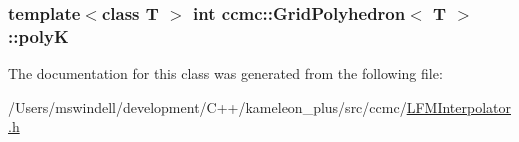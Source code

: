 \hypertarget{classccmc_1_1_grid_polyhedron_a2d84c3c8aa5821be3888d1bb636d2224}{
\subsubsection[{poly\-K}]{\setlength{\rightskip}{0pt plus 5cm}template$<$class T $>$ int {\bf ccmc\-::\-Grid\-Polyhedron}$<$ T $>$\-::poly\-K}}\label{classccmc_1_1_grid_polyhedron_a2d84c3c8aa5821be3888d1bb636d2224}


The documentation for this class was generated from the following file\-:\begin{DoxyCompactItemize}
\item 
/\-Users/mswindell/development/\-C++/kameleon\-\_\-plus/src/ccmc/\hyperlink{_l_f_m_interpolator_8h}{L\-F\-M\-Interpolator.\-h}\end{DoxyCompactItemize}

